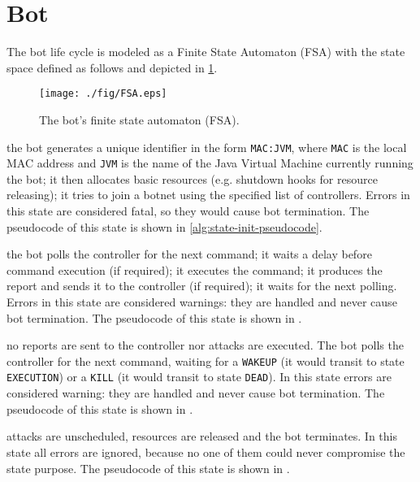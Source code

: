 \section{Bot}
\label{sec:bot}

The bot life cycle is modeled as a Finite State Automaton (FSA) with the state space defined as follows and depicted in \ref{fig:bot-fsa}.

\begin{figure}[tp]
  \centering
  \texttt{[image: ./fig/FSA.eps]}
  \caption{The bot's finite state automaton (FSA).}
    \label{fig:bot-fsa}
\end{figure}

\begin{description}
  \setlength\itemsep{1em}

  \item[INIT] the bot generates a unique identifier in the form \texttt{MAC:JVM}, where \texttt{MAC} is the local MAC address and \texttt{JVM} is the name of the Java Virtual Machine currently running the bot; it then allocates basic resources (e.g. shutdown hooks for resource releasing); it tries to join a botnet using the specified list of controllers.
  Errors in this state are considered fatal, so they would cause bot termination. The pseudocode of this state is shown in \cref{alg:state-init-pseudocode}.

  \item[EXECUTION] the bot polls the controller for the next command; it waits a delay before command execution (if required); it executes the command; it produces the report and sends it to the controller (if required); it waits for the next polling.
  Errors in this state are considered warnings: they are handled and never cause bot termination. The pseudocode of this state is shown in .

  \item[SLEEP] no reports are sent to the controller nor attacks are executed. The bot polls the controller for the next command, waiting for a \texttt{WAKEUP} (it would transit to state \texttt{EXECUTION}) or a \texttt{KILL} (it would transit to state \texttt{DEAD}).
  In this state errors are considered warning: they are handled and never cause bot termination. The pseudocode of this state is shown in .

  \item[DEAD] attacks are unscheduled, resources are released and the bot terminates. In this state all errors are ignored, because no one of them could never compromise the state purpose. The pseudocode of this state is shown in .

\end{description}

